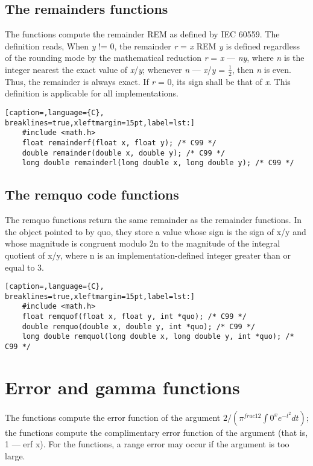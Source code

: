 \subsection{The remainders functions}
The functions compute the remainder REM as defined by IEC 60559. The definition
reads, When \emph{y} != 0, the remainder \emph{r} = \emph{x} REM \emph{y} is
defined regardless of the rounding mode by the mathematical reduction \emph{r}
= \emph{x} --- \emph{ny}, where \emph{n} is the integer nearest the exact value
of \emph{x}/\emph{y}; whenever \textbar{}\emph{n} ---
\emph{x}/\emph{y}\textbar{} = $\frac{1}{2}$, then \emph{n} is even.  Thus, the
remainder is always exact. If \emph{r} = 0, its sign shall be that of \emph{x}.
This definition is applicable for all implementations.
\lstset{basicstyle=\scriptsize, numbers=left, captionpos=b, tabsize=4}
\begin{lstlisting}[caption=,language={C},
breaklines=true,xleftmargin=15pt,label=lst:]
	#include <math.h>
	float remainderf(float x, float y); /* C99 */
	double remainder(double x, double y); /* C99 */
	long double remainderl(long double x, long double y); /* C99 */
\end{lstlisting}

\subsection{The remquo code functions}
The remquo functions return the same remainder as the remainder functions. In
the object pointed to by quo, they store a value whose sign is the sign of x/y
and whose magnitude is congruent modulo 2n to the magnitude of the integral
quotient of x/y, where n is an implementation-defined integer greater than or
equal to 3.
\lstset{basicstyle=\scriptsize, numbers=left, captionpos=b, tabsize=4}
\begin{lstlisting}[caption=,language={C},
breaklines=true,xleftmargin=15pt,label=lst:]
	#include <math.h>
	float remquof(float x, float y, int *quo); /* C99 */
	double remquo(double x, double y, int *quo); /* C99 */
	long double remquol(long double x, long double y, int *quo); /* C99 */
\end{lstlisting}

\section{Error and gamma functions}
The functions compute the error function of the argument $2/(\pi^{frac{1}{2}}
\int 0^{x} e^{-t^{2}} dt)$; the functions compute the complimentary error
function of the argument (that is, 1 --- erf x). For the functions, a range
error may occur if the argument is too large.

